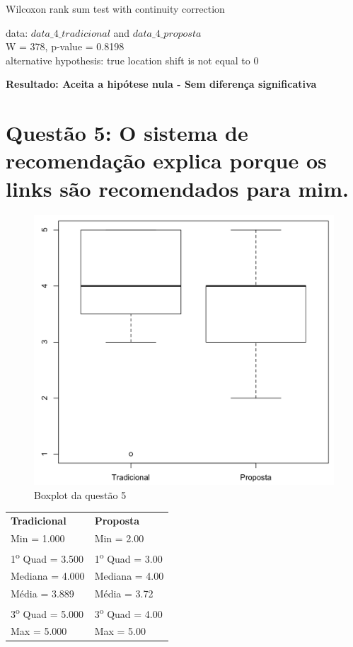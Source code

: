 Wilcoxon rank sum test with continuity correction

\noindent
data:  $data\_4\_tradicional$ and $data\_4\_proposta$\\
W = 378, p-value = 0.8198\\
alternative hypothesis: true location shift is not equal to 0

\noindent
\textbf{Resultado: Aceita a hipótese nula - Sem diferença significativa}

\newpage
\section{Questão 5: O sistema de recomendação explica porque os links são recomendados para mim.}

\begin{figure}[htb]
  \caption{\label{fig:questao5-boxplot}Boxplot da questão 5}
  \begin{center}
      \includegraphics[scale=0.4]{./Figuras/questao5-boxplot.png}
  \end{center}
\end{figure}

\begin{table}[h]
\begin{tabular}{p{}p{}}
\textbf{Tradicional} & \textbf{Proposta} \\
Min = 1.000 & Min = 2.00\\
1\textsuperscript{o} Quad = 3.500 & 1\textsuperscript{o} Quad = 3.00\\
Mediana = 4.000 & Mediana = 4.00\\
Média = 3.889 & Média = 3.72\\
3\textsuperscript{o} Quad = 5.000 & 3\textsuperscript{o} Quad = 4.00\\
Max = 5.000 & Max = 5.00\\
\end{tabular}
\end{table}

